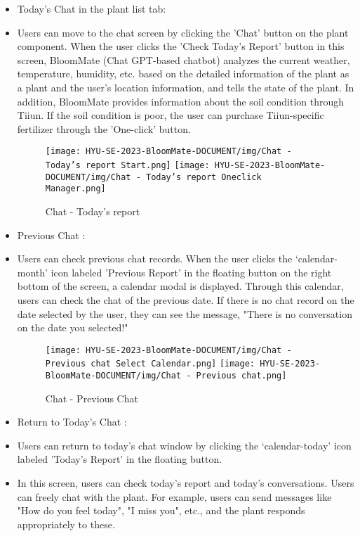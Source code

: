 \documentclass[conference, a4paper]{IEEEtran}
\begin{document}
\begin{enumerate}
\begin{itemize}
        \item Today's Chat in the plant list tab: 
        \item[] Users can move to the chat screen by clicking the 'Chat' button on the plant component. When the user clicks the 'Check Today's Report' button in this screen, BloomMate (Chat GPT-based chatbot) analyzes the current weather, temperature, humidity, etc. based on the detailed information of the plant as a plant and the user's location information, and tells the state of the plant. In addition, BloomMate provides information about the soil condition through Tiiun. If the soil condition is poor, the user can purchase Tiiun-specific fertilizer through the 'One-click' button.
        \begin{figure}[h]
        \centerline{
            \texttt{[image: HYU-SE-2023-BloomMate-DOCUMENT/img/Chat - Today's report Start.png]}
            \texttt{[image: HYU-SE-2023-BloomMate-DOCUMENT/img/Chat - Today's report Oneclick Manager.png]}
        }
        \label{fig}
        \caption{Chat - Today's report}
        \end{figure}
   
        \item Previous Chat : 
        \item[] Users can check previous chat records. When the user clicks the ‘calendar-month’ icon labeled 'Previous Report' in the floating button on the right bottom of the screen, a calendar modal is displayed. Through this calendar, users can check the chat of the previous date. If there is no chat record on the date selected by the user, they can see the message, "There is no conversation on the date you selected!"
        \begin{figure}[h]
        \centerline{
            \texttt{[image: HYU-SE-2023-BloomMate-DOCUMENT/img/Chat - Previous chat Select Calendar.png]}
            \texttt{[image: HYU-SE-2023-BloomMate-DOCUMENT/img/Chat - Previous chat.png]}
        }
        \label{fig}
        \caption{Chat - Previous Chat}
        \end{figure}
 
        \item Return to Today's Chat : 
        \item[] Users can return to today's chat window by clicking the ‘calendar-today’ icon labeled 'Today's Report' in the floating button. 
        \item[] In this screen, users can check today's report and today's conversations. Users can freely chat with the plant. For example, users can send messages like "How do you feel today", "I miss you", etc., and the plant responds appropriately to these.\\


\end{itemize}
\end{enumerate}
\end{document}
